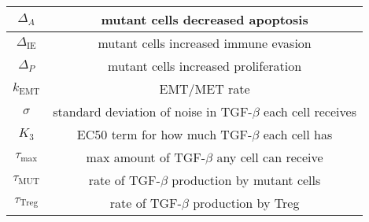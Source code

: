 \documentclass[11pt, a4paper, preprint]{article}
\begin{document}
\begin{center}
\begin{longtable}{|| c | c||}
  \hline
  $\Delta_A$ & mutant cells decreased apoptosis  \\
  \hline
  $\Delta_\text{IE}$ & mutant cells increased immune evasion  \\
  \hline
  $\Delta_P$ & mutant cells increased proliferation  \\
  \hline
  $k_\text{EMT}$ & EMT/MET rate  \\
  \hline
  $\sigma$ & standard deviation of noise in TGF-$\beta$ each cell receives  \\
  \hline
  $K_3$ & EC50 term for how much TGF-$\beta$ each cell has \\
  \hline
 $\tau_\text{max}$ & max amount of TGF-$\beta$ any cell can receive \\
  \hline 
 $\tau_\text{MUT}$ & rate of TGF-$\beta$ production by mutant cells\\
  \hline
 $\tau_\text{Treg}$ & rate of TGF-$\beta$ production by Treg\\
  \hline
\end{longtable}
\end{center}

\newpage
\end{document}

